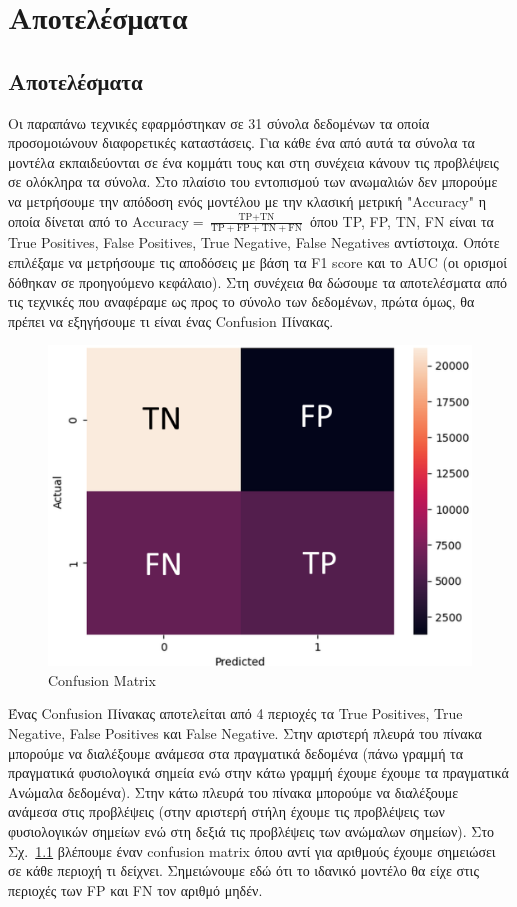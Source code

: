 \documentclass[a4paper,12pt]{report}
\theoremstyle{definitionNODot}
\begin{document}
	\chapter{Αποτελέσματα}
	\section{Αποτελέσματα}
	Οι παραπάνω τεχνικές εφαρμόστηκαν σε 31 σύνολα δεδομένων τα οποία προσομοιώνουν διαφορετικές καταστάσεις. Για κάθε ένα από αυτά τα σύνολα τα μοντέλα εκπαιδεύονται σε ένα κομμάτι τους και στη συνέχεια κάνουν τις προβλέψεις σε ολόκληρα τα σύνολα. Στο πλαίσιο του εντοπισμού των ανωμαλιών δεν μπορούμε να μετρήσουμε την απόδοση ενός μοντέλου με την κλασική μετρική "Accuracy" η οποία δίνεται από το $\text{Accuracy} = \frac{\text{TP}+\text{TN}}{\text{TP}+\text{FP}+\text{TN}+\text{FN}}$ όπου TP, FP, TN, FN είναι τα True Positives, False Positives, True Negative, False Negatives αντίστοιχα. Οπότε επιλέξαμε να μετρήσουμε τις αποδόσεις με βάση τα F1 score και το AUC (οι ορισμοί δόθηκαν σε προηγούμενο κεφάλαιο). Στη συνέχεια θα δώσουμε τα αποτελέσματα από τις τεχνικές που αναφέραμε ως προς το σύνολο των δεδομένων, πρώτα όμως, θα πρέπει να εξηγήσουμε τι είναι ένας Confusion Πίνακας.
	
	\begin{figure}[h]
		\centering
		\includegraphics[width=\textwidth/2]{confusionmatrixexplain.png}
		\caption{Confusion Matrix}
		\label{fig:confusionmatrixexplain}
	\end{figure}
	
	Ένας Confusion Πίνακας αποτελείται από 4 περιοχές τα True Positives, True Negative, False Positives και False Negative. Στην αριστερή πλευρά του πίνακα μπορούμε να διαλέξουμε ανάμεσα στα πραγματικά δεδομένα (πάνω γραμμή τα πραγματικά φυσιολογικά σημεία ενώ στην κάτω γραμμή έχουμε έχουμε τα πραγματικά Ανώμαλα δεδομένα). Στην κάτω πλευρά του πίνακα μπορούμε να διαλέξουμε ανάμεσα στις προβλέψεις (στην αριστερή στήλη έχουμε τις προβλέψεις των φυσιολογικών σημείων ενώ στη δεξιά τις προβλέψεις των ανώμαλων σημείων). Στο Σχ.~\ref{fig:confusionmatrixexplain} βλέπουμε έναν confusion matrix όπου αντί για αριθμούς έχουμε σημειώσει σε κάθε περιοχή τι δείχνει. Σημειώνουμε εδώ ότι το ιδανικό μοντέλο θα είχε στις περιοχές των FP και FN τον αριθμό μηδέν.
	
\end{document}
